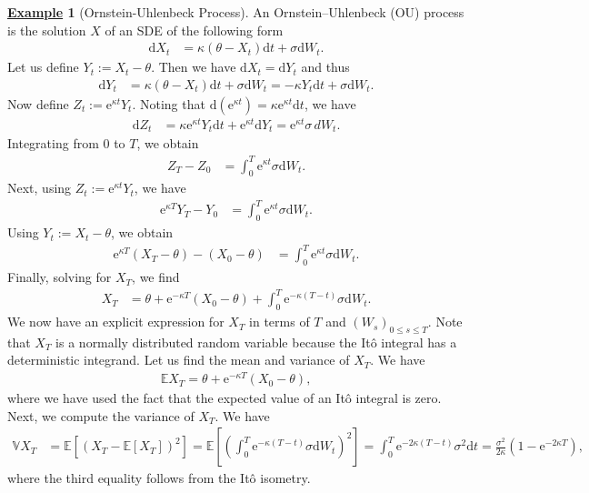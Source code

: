\documentclass[12pt]{book}
\numberwithin{equation}{chapter}
\theoremstyle{plain}
\numberwithin{theorem}{section}
\theoremstyle{definition}
\newtheorem{example}[theorem]{\underline{Example}}
\numberwithin{exercise}{chapter}
\newcommand{\<}{\langle}
\renewcommand{\>}{\rangle}
\renewcommand{\(}{\left(}
\renewcommand{\)}{\right)}
\renewcommand{\[}{\left[}
\renewcommand{\]}{\right]}
\newcommand\Eb{\mathds{E}}
\newcommand\Vb{\mathds{V}}
\newcommand\dd{\mathrm{d}}
\newcommand\ee{\mathrm{e}}
\theoremstyle{definition}
\numberwithin{question}{section}
\begin{document}
\begin{example}[Ornstein-Uhlenbeck Process]
\label{ex:OU}
An Ornstein--Uhlenbeck (OU) process is the solution $X$ of an SDE of the following form
\begin{align}
\dd X_t 
	&= \kappa (\theta - X_t) \dd t + \sigma \dd W_t.
\end{align}
Let us define $Y_t := X_t - \theta$. Then we have $\dd X_t = \dd Y_t$ and thus
\begin{align}
\dd Y_t 
	&=	\kappa (\theta - X_t) \dd t + \sigma \dd W_t
	= 	-\kappa Y_t \dd t + \sigma  \dd W_t.
\end{align}
Now define $Z_t := \ee^{\kappa t} Y_t$. Noting that $\dd (\ee^{\kappa t}) = \kappa \ee^{\kappa t} \dd t$, we have
\begin{align}
\dd Z_t 
	&=	\kappa \ee^{\kappa t} Y_t \dd t + \ee^{\kappa t} \dd Y_t 
	= \ee^{\kappa t} \sigma \, dW_t.
\end{align}
Integrating from $0$ to $T$, we obtain
\begin{align}
Z_T - Z_0 
		&= \int_0^T \ee^{\kappa t} \sigma \dd W_t .
\end{align}
Next, using $Z_t := \ee^{\kappa t} Y_t$, we have
\begin{align}
\ee^{\kappa T} Y_T - Y_0
	&=  \int_0^T \ee^{\kappa t} \sigma \dd W_t .
\end{align}
Using $Y_t := X_t - \theta$, we obtain
\begin{align}
\ee^{\kappa T} (X_T - \theta) - (X_0 - \theta)
	&=  \int_0^T \ee^{\kappa t} \sigma \dd W_t .
\end{align}
Finally, solving for $X_T$, we find
\begin{align}
X_T 
	&=	\theta + \ee^{-\kappa T} (X_0 - \theta) + \int_0^T \ee^{-\kappa(T-t)} \sigma \dd W_t.
\end{align}
We now have an explicit expression for $X_T$ in terms of $T$ and $(W_s)_{0 \leq s \leq T}$.  Note that $X_T$ is a normally distributed random variable because the It\^o integral has a deterministic integrand.  Let us find the mean and variance of $X_T$.  We have
\begin{align}
\Eb X_T = \theta + \ee^{-\kappa T} (X_0 - \theta),
\end{align}
where we have used the fact that the expected value of an It\^o integral is zero.
Next, we compute the variance of $X_T$.  We have
\begin{align}
\Vb X_T
	&= \Eb[(X_T - \Eb[X_T])^2]  
	 = \Eb \[ \( \int_0^T \ee^{-\kappa(T-t)} \sigma \dd W_t \)^2 \]  
	 = \int_0^T \ee^{-2\kappa(T-t)} \sigma^2 \dd t  
	 = \frac{\sigma^2}{2\kappa} (1 - \ee^{-2\kappa T}) ,
\end{align}
where the third equality follows from the It\^o isometry.
\end{example}
\end{document}
